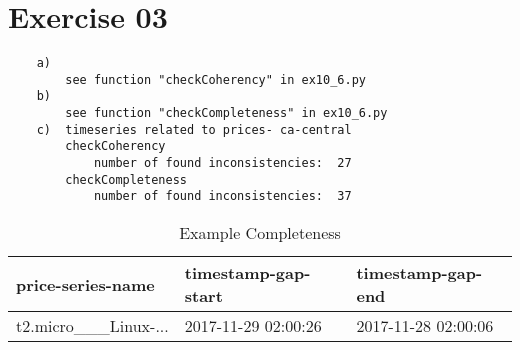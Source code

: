 \documentclass[11pt,a4paper]{scrartcl}
\begin{document}
\section*{Exercise 03}
\begin{verbatim}
	a) 
		see function "checkCoherency" in ex10_6.py
	b) 
		see function "checkCompleteness" in ex10_6.py
	c)	timeseries related to prices- ca-central
		checkCoherency
			number of found inconsistencies:  27
		checkCompleteness
			number of found inconsistencies:  37
\end{verbatim}

\begin{table}[]
\centering
\caption{Example Completeness}
\label{my-label}
\begin{tabular}{lll}
\hline
\multicolumn{1}{|l|}{price-series-name} & \multicolumn{1}{l|}{timestamp-gap-start} & \multicolumn{1}{l|}{timestamp-gap-end} \\ \hline
t2.micro\_\_\_Linux-...                 & 2017-11-29 02:00:26                      & 2017-11-28 02:00:06                   
\end{tabular}
\end{table}
	
\end{document}
